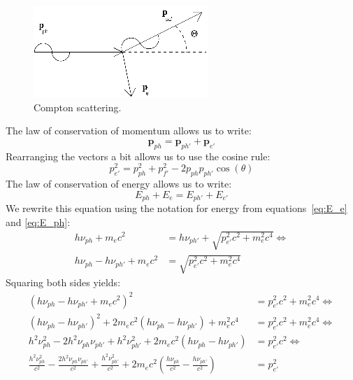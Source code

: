 \documentclass[12pt,a4paper]{article}
\numberwithin{equation}{section}
\numberwithin{figure}{section}
\numberwithin{table}{section}
\begin{document}
\begin{figure}\begin{center}
\includegraphics[scale=3]{compton.eps}%
\caption{Compton scattering.}\label{fig:coll}
\end{center}\end{figure}

The law of conservation of momentum allows us to write:
\begin{equation}
\textbf{p}_{ph} = \textbf{p}_{ph'} + \textbf{p}_{e'}
\end{equation}
Rearranging the vectors a bit allows us to use the cosine rule:
\begin{equation}
p^2_{e'} = p^2_{ph} + p^2_{f'} - 2p_{ph}p_{ph'}\cos(\theta) \label{eq:en_final}
\end{equation}
The law of conservation of energy allows us to write:
\begin{equation}
E_{ph} +E_e = E_{ph'} + E_{e'}
\end{equation}
We rewrite this equation using the notation for energy from equations~\ref{eq:E_e} and \ref{eq:E_ph}:
\begin{align}
h \nu_{ph} + m_e c^2 &= h \nu_{ph'} + \sqrt{p^2_{e'}c^2 + m^2_e c^4} \Longleftrightarrow\\
h \nu_{ph} - h \nu_{ph'} + m_e c^2 &= \sqrt{p^2_{e'}c^2 + m^2_e c^4}
\end{align}
Squaring both sides yields:
\begin{align}
\left( h \nu_{ph} - h \nu_{ph'} + m_e c^2 \right)^2 &= p^2_{e'}c^2 + m^2_e c^4 \Longleftrightarrow\\
\left( h \nu_{ph} - h \nu_{ph'} \right)^2 + 2m_e c^2 \left( h \nu_{ph} - h \nu_{ph'}\right) + m^2_e c^4 &= p^2_{e'}c^2 + m^2_e c^4 \Longleftrightarrow\\
h^2\nu^2_{ph} - 2h^2\nu_{ph}\nu_{ph'} + h^2\nu^2_{ph'} + 2m_ec^2 \left( h\nu_{ph} - h\nu_{ph'} \right) &= p^2_{e'}c^2 \Longleftrightarrow\\
\frac{h^2\nu^2_{ph}}{c^2} - \frac{2h^2\nu_{ph}\nu_{ph'}}{c^2} + \frac{h^2\nu^2_{ph'}}{c^2}+ 2m_ec^2 \left(  \frac{h\nu_{ph}}{c^2} - \frac{h\nu_{ph'}}{c^2} \right) &= p^2_{e'} \label{eq:mom_final}
\end{align}
\end{document}
